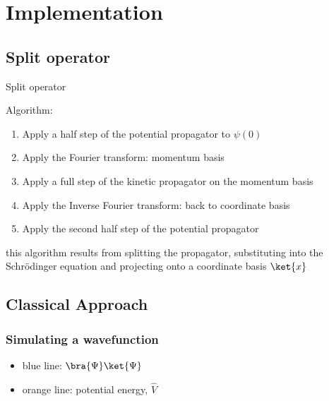 \documentclass[10pt,a4paper]{beamer}
\begin{document}
\section{Implementation}
\subsection{Split operator}
\begin{frame}

\begin{Definition}
 Split operator
\end{Definition}
  
Algorithm: \\

\begin{enumerate}
\item Apply a half step of the potential propagator to $\psi(0)$ \\
\item Apply the Fourier transform: momentum basis \\
\item Apply a full step of the kinetic propagator on the momentum basis\\
\item Apply the Inverse Fourier transform: back to coordinate basis\\
\item Apply the second half step of the potential propagator\\
\end{enumerate}
\vspace{0.1in}
this algorithm results from splitting the propagator, substituting into the Schrödinger equation and projecting onto a coordinate basis $\ket{x}$
\end{frame}

\subsection{Classical Approach}
\begin{frame}
  \frametitle{Simulating a wavefunction}
  \begin{itemize}
  	\item blue line:  $\bra{\Psi}\ket{\Psi}$ 
  	\item orange line: potential energy, $\hat{V}$
  \end{itemize}
\end{frame}
\end{document}
